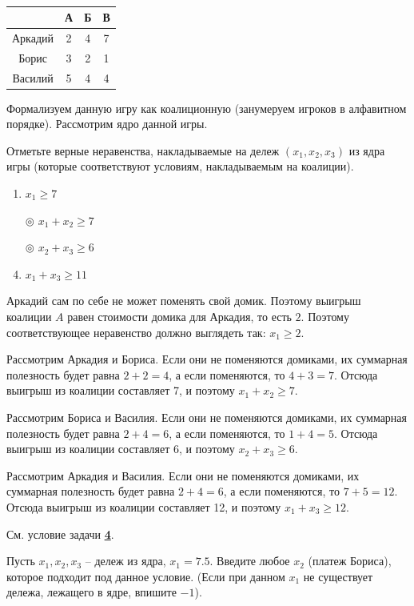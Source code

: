 	\begin{table}[h]
		\label{prob4:table1}
		\caption{}
		\centering
		\begin{tabular}{|c|c|c|c|}
			\hline & А & Б & В \\ 	
			\hline Аркадий & 2 & 4 & 7 \\ 
			\hline Борис & 3 & 2 & 1 \\ 
			\hline Василий & 5 & 4 & 4 \\ 
			\hline 
		\end{tabular} 
	\end{table}
	
	Формализуем данную игру как коалиционную (занумеруем игроков в алфавитном порядке). Рассмотрим ядро данной игры.
	
	Отметьте верные неравенства, накладываемые на дележ $(x_1,x_2,x_3)$ из ядра игры (которые соответствуют условиям, накладываемым на коалиции).
	
	\begin{enumerate}[label=$\circ$]
		\item $x_1 \geq 7$
		\item[$\circledcirc$] $x_1 + x_2 \geq 7$
		\item[$\circledcirc$] $x_2 + x_3 \geq 6$
		\item $x_1 + x_3 \geq 11$
	\end{enumerate}

	\solution
	Аркадий сам по себе не может поменять свой домик. Поэтому выигрыш коалиции $A$ равен стоимости домика для Аркадия, то есть $2$. Поэтому соответствующее неравенство должно выглядеть так: $x_1 \geq 2$.
	
	Рассмотрим Аркадия и Бориса. Если они не поменяются домиками, их суммарная полезность будет равна $2+2=4$, а если поменяются, то $4+3=7$. Отсюда выигрыш из коалиции составляет 7, и поэтому $x_1+x_2 \geq 7$.
	
	Рассмотрим Бориса и Василия. Если они не поменяются домиками, их суммарная полезность будет равна $2+4=6$, а если поменяются, то $1+4=5$. Отсюда выигрыш из коалиции составляет 6, и поэтому $x_2+x_3 \geq 6$.
	
	Рассмотрим Аркадия и Василия. Если они не поменяются домиками, их суммарная полезность будет равна $2+4=6$, а если поменяются, то $7+5=12$. Отсюда выигрыш из коалиции составляет 12, и поэтому $x_1+x_3 \geq 12$.

	\task
	См. условие задачи \hyperref[sec4]{\textbf{4}}.
	
	Пусть $x_1,x_2,x_3$ -- дележ из ядра, $x_1 = 7.5$. Введите любое $x_2$ (платеж Бориса), которое подходит под данное условие. (Если при данном $x_1$ не существует дележа, лежащего в ядре, впишите $-1$).
	

